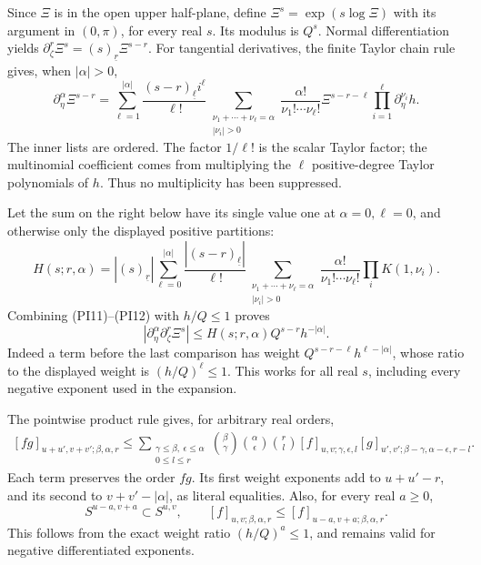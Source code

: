 \documentclass[
  11pt,
]{article}
\begin{document}
Since \(\Xi\) is in the open upper half-plane, define
\(\Xi^s=\exp(s\log\Xi)\) with its argument in \((0,\pi)\), for every
real \(s\). Its modulus is \(Q^s\). Normal differentiation yields
\(\partial_\zeta^r\Xi^s=(s)_{\underline r}\Xi^{s-r}\). For tangential
derivatives, the finite Taylor chain rule gives, when \(|\alpha|>0\), \[
 \partial_\eta^\alpha\Xi^{s-r}
 =\sum_{\ell=1}^{|\alpha|}
 \frac{(s-r)_{\underline\ell}i^\ell}{\ell!}
 \sum_{\substack{\nu_1+\cdots+\nu_\ell=\alpha\\|\nu_i|>0}}
 \frac{\alpha!}{\nu_1!\cdots\nu_\ell!}
 \Xi^{s-r-\ell}\prod_{i=1}^\ell\partial_\eta^{\nu_i}h.
 \tag{PI12}
\] The inner lists are ordered. The factor \(1/\ell!\) is the scalar
Taylor factor; the multinomial coefficient comes from multiplying the
\(\ell\) positive-degree Taylor polynomials of \(h\). Thus no
multiplicity has been suppressed.

Let the sum on the right below have its single value one at
\(\alpha=0,\ell=0\), and otherwise only the displayed positive
partitions: \[
 H(s;r,\alpha)=
 |(s)_{\underline r}|
 \sum_{\ell=0}^{|\alpha|}
 \frac{|(s-r)_{\underline\ell}|}{\ell!}
 \sum_{\substack{\nu_1+\cdots+\nu_\ell=\alpha\\|\nu_i|>0}}
 \frac{\alpha!}{\nu_1!\cdots\nu_\ell!}
 \prod_i K(1,\nu_i).
 \tag{PI13}
\] Combining (PI11)--(PI12) with \(h/Q\leq1\) proves \[
 |\partial_\eta^\alpha\partial_\zeta^r\Xi^s|
 \leq H(s;r,\alpha)Q^{s-r}h^{-|\alpha|}.
 \tag{PI14}
\] Indeed a term before the last comparison has weight
\(Q^{s-r-\ell}h^{\ell-|\alpha|}\), whose ratio to the displayed weight
is \((h/Q)^\ell\leq1\). This works for all real \(s\), including every
negative exponent used in the expansion.

The pointwise product rule gives, for arbitrary real orders, \[
 \begin{split}
 [fg]_{u+u',v+v';\beta,\alpha,r}
 \leq
 \sum_{\substack{\gamma\leq\beta,\ \epsilon\leq\alpha\\0\leq l\leq r}}
 \binom{\beta}{\gamma}\binom{\alpha}{\epsilon}\binom rl
 [f]_{u,v;\gamma,\epsilon,l}
 [g]_{u',v';\beta-\gamma,\alpha-\epsilon,r-l}.
 \end{split}
 \tag{PI15}
\] Each term preserves the order \(fg\). Its first weight exponents add
to \(u+u'-r\), and its second to \(v+v'-|\alpha|\), as literal
equalities. Also, for every real \(a\geq0\), \[
 S^{u-a,v+a}\subset S^{u,v},\qquad
 [f]_{u,v;\beta,\alpha,r}\leq[f]_{u-a,v+a;\beta,\alpha,r}.
 \tag{PI16}
\] This follows from the exact weight ratio \((h/Q)^a\leq1\), and
remains valid for negative differentiated exponents.
\end{document}
